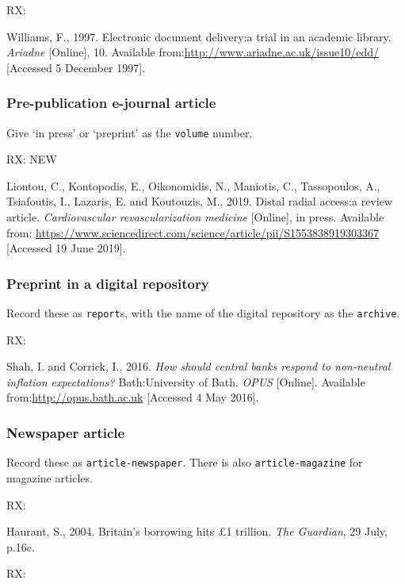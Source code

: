 RX: \cite{williams1997edd}

Williams, F., 1997. Electronic document delivery:\@ a trial in an academic library. \emph{Ariadne} [Online], 10. Available from:\@ \url{http://www.ariadne.ac.uk/issue10/edd/} [Accessed 5 December 1997].



\subsubsection*{Pre-publication e-journal article}

Give `in press' or `preprint' as the \texttt{volume} number.

RX: \cite{liontou.etal2019dra} NEW

Liontou, C., Kontopodis, E., Oikonomidis, N., Maniotis, C., Tassopoulos, A., Tsiafoutis, I., Lazaris, E. and Koutouzis, M., 2019. Distal radial access:\@ a review article. \emph{Cardiovascular revascularization medicine} [Online], in press. Available from: \url{https://www.sciencedirect.com/science/article/pii/S1553838919303367} [Accessed 19 June 2019].



\subsubsection*{Preprint in a digital repository}

Record these as \texttt{report}s, with the name of the digital repository as the \texttt{archive}.

RX: \cite{shah.corrick2016hsc}

Shah, I. and Corrick, I., 2016. \emph{How should central banks respond to non-neutral inflation expectations?} Bath:\@ University of Bath. \emph{OPUS} [Online]. Available from:\@ \url{http://opus.bath.ac.uk} [Accessed 4 May 2016].



\subsubsection*{Newspaper article}

Record these as \texttt{article-newspaper}. There is also \texttt{article-magazine} for magazine articles.

RX: \cite{haurant2004bbh}

Haurant, S., 2004. Britain's borrowing hits £1 trillion. \emph{The Guardian}, 29 July, p.16c.


RX: \cite{independent1992pub}

